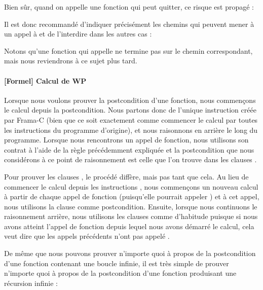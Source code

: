 

Bien sûr, quand on appelle une fonction qui peut quitter, ce risque est propagé :






Il est donc recommandé d'indiquer précisément les chemins qui peuvent mener à
un appel à  et de l'interdire dans les autres cas :




Notons qu'une fonction qui appelle  ne termine pas sur le
chemin correspondant, mais nous reviendrons à ce sujet plus tard.



\paragraph*{[Formel] Calcul de WP}


Lorsque nous voulons prouver la postcondition d'une fonction, nous commençons le
calcul depuis la postcondition. Nous partons donc de l'unique instruction
 créée par Frama-C (bien que ce soit exactement comme
commencer le calcul par toutes les instructions  du programme
d'origine), et nous raisonnons en arrière le long du programme. Lorsque nous
rencontrons un appel de fonction, nous utilisons son contrat à l'aide de la
règle précédemment expliquée et la postcondition que nous considérons à ce
point de raisonnement est celle  que l'on trouve dans les clauses
.


Pour prouver les clauses , le procédé diffère, mais pas tant que
cela. Au lieu de commencer le calcul depuis les instructions ,
nous commençons un nouveau calcul à partir de chaque appel de fonction
(puisqu'elle pourrait appeler ) et à cet appel, nous utilisons
la clause  comme postcondition. Ensuite, lorsque nous
continuons le raisonnement arrière, nous utilisons les clauses
 comme d'habitude puisque si nous avons atteint l'appel de
fonction depuis lequel nous avons démarré le calcul, cela veut dire que les
appels précédents n'ont pas appelé .



De même que nous pouvons prouver n'importe quoi à propos de la
postcondition d'une fonction contenant une boucle infinie, il est très simple
de prouver n'importe quoi à propos de la postcondition d'une fonction
produisant une récursion infinie :


